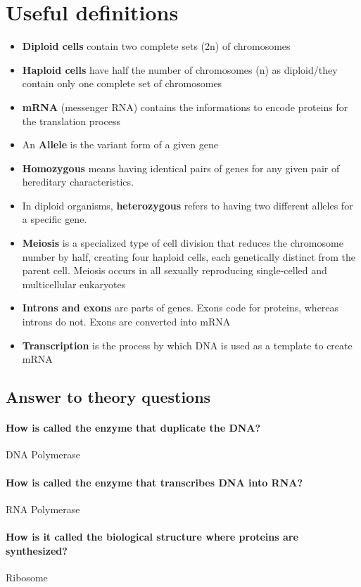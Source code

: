 \newpage
\section{Useful definitions}

\begin{itemize}
	\item \textbf{Diploid cells} contain two complete sets (2n) of
chromosomes
	\item \textbf{Haploid cells} have half the number of chromosomes
(n) as diploid/they contain only one complete set of chromosomes
	\item \textbf{mRNA} (messenger RNA) contains the informations to encode
proteins for the translation process
	\item An \textbf{Allele} is the variant form of a given gene
	\item \textbf{Homozygous} means having identical pairs of genes for any 
given pair of hereditary characteristics.
	\item In diploid organisms, \textbf{heterozygous} refers to having two
different alleles for a specific gene.
	\item \textbf{Meiosis} is a specialized type of cell division that
reduces the chromosome number by half, creating four haploid cells, each
genetically distinct from the parent cell. Meiosis occurs in all sexually
reproducing single-celled and multicellular eukaryotes
	\item \textbf{Introns and exons} are parts of genes.
Exons code for proteins, whereas introns do not. Exons are converted into
mRNA
	\item \textbf{Transcription} is the process by which DNA is used as a
template to create mRNA
\end{itemize}

\subsection{Answer to theory questions}

\paragraph*{How is called the enzyme that duplicate the DNA?} DNA Polymerase
\paragraph*{How is called the enzyme that transcribes DNA into RNA?} RNA Polymerase
\paragraph*{How is it called the biological structure where proteins are
synthesized?} Ribosome
